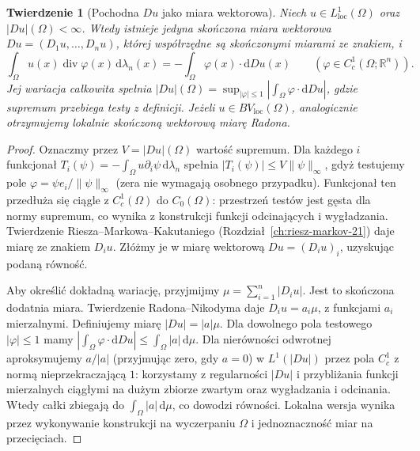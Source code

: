 \documentclass[11pt,a4paper,oneside]{book}
\numberwithin{equation}{chapter}
\theoremstyle{plain}
\newtheorem{twierdzenie}{Twierdzenie}[chapter]
\theoremstyle{definition}
\theoremstyle{remark}
\begin{document}
\begin{twierdzenie}[Pochodna $Du$ jako miara wektorowa]
\label{thm:BV-measure-29}
Niech $u\in L^1_{\mathrm{loc}}(\Omega)$ oraz
$|Du|(\Omega)<\infty$. Wtedy istnieje jedyna
skończona miara wektorowa $Du=(D_1u,\ldots,D_nu)$,
której współrzędne są skończonymi miarami ze znakiem,
i
\[
 \int_\Omega u(x)\operatorname{div}\varphi(x)
 \,\mathrm d\lambda_n(x)
 =-\int_\Omega\varphi(x)\cdot\mathrm dDu(x)
 \qquad(\varphi\in C_c^1(\Omega;\mathbb R^n)).
\]
Jej wariacja całkowita spełnia
$|Du|(\Omega)=\sup_{|\varphi|\le1}|
\int_\Omega \varphi\cdot\mathrm dDu|$,
gdzie supremum przebiega testy z definicji.
Jeżeli $u\in BV_{\mathrm{loc}}(\Omega)$,
analogicznie otrzymujemy lokalnie skończoną
wektorową miarę Radona.
\end{twierdzenie}
\begin{proof}
Oznaczmy przez $V=|Du|(\Omega)$ wartość supremum.
Dla każdego $i$ funkcjonał
$T_i(\psi)=-\int_\Omega u\partial_i\psi\,\mathrm d\lambda_n$
spełnia $|T_i(\psi)|\le V\|\psi\|_\infty$,
gdyż testujemy pole $\varphi=\psi e_i/\|\psi\|_\infty$
(zera nie wymagają osobnego przypadku). Funkcjonał ten
przedłuża się ciągle z $C_c^1(\Omega)$ do $C_0(\Omega)$:
przestrzeń testów jest gęsta dla normy supremum,
co wynika z konstrukcji funkcji odcinających i wygładzania.
Twierdzenie Riesza--Markowa--Kakutaniego
(Rozdział~\ref{ch:riesz-markov-21})
daje miarę ze znakiem $D_i u$. Złóżmy je w miarę wektorową
$Du=(D_iu)_i$, uzyskując podaną równość.

Aby określić dokładną wariację, przyjmijmy
$\mu=\sum_{i=1}^n|D_i u|$. Jest to skończona dodatnia
miara. Twierdzenie Radona--Nikodyma daje
$D_i u=a_i\mu$, z funkcjami $a_i$ mierzalnymi.
Definiujemy miarę $|Du|=|a|\mu$.
Dla dowolnego pola testowego $|\varphi|\le1$ mamy
$\left|\int_\Omega\varphi\cdot\mathrm dDu\right|
\le\int_\Omega|a|\,\mathrm d\mu$.
Dla nierówności odwrotnej aproksymujemy
$a/|a|$ (przyjmując zero, gdy $a=0$) w $L^1(|Du|)$
przez pola $C_c^1$ z normą nieprzekraczającą $1$:
korzystamy z regularności $|Du|$ i przybliżania
funkcji mierzalnych ciągłymi na dużym zbiorze zwartym
oraz wygładzania i odcinania. Wtedy całki zbiegają
do $\int_\Omega|a|\,\mathrm d\mu$, co dowodzi równości.
Lokalna wersja wynika przez wykonywanie konstrukcji
na wyczerpaniu $\Omega$ i jednoznaczność miar na
przecięciach.
\end{proof}
\end{document}
